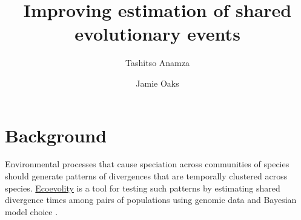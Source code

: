 \documentclass[a0paper,fleqn]{betterposter}
\begin{document}
{{\begin{center}
{\begin{minipage}[t]{0.92\textwidth}
\begin{center}
\vspace{-1.5ex}
\end{center}
\end{minipage}}
\end{center}

\vspace{-20ex}
}{

\hspace{10em}


}

}{

\title{Improving estimation of shared evolutionary events}
\author{Tashitso Anamza}
\author{Jamie Oaks}
\vspace{0.5ex}

\vspace{-2ex}
\section{Background}
\vspace{-0.5ex}
Environmental processes that cause speciation across communities of species
should generate patterns of divergences that are temporally clustered across
species.
\href{http://phyletica.org/ecoevolity/}{Ecoevolity}
is a tool for testing such patterns by estimating shared divergence
times among pairs of populations using genomic data and Bayesian model choice
\cite{Oaks2018ecoevolity}.

}
\end{document}
